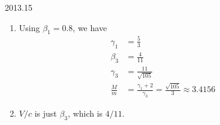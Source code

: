 \documentclass[12pt]{article}
\begin{document}
\begin{solution}{2013.15}
\begin{enumerate}
\item
Using $\beta_1 = 0.8$, we have
\begin{align*}
\gamma_1 & = \frac{5}{3} \\
\beta_3 & = \frac{4}{11} \\
\gamma_3 & = \frac{11}{\sqrt{105}} \\
\frac{M}{m} & = \frac{\gamma_1 + 2}{\gamma_3} = \frac{\sqrt{105}}{3} \approx 3.4156
\end{align*}

\item
$V/c$ is just $\beta_3$, which is $4/11$.

\end{enumerate}


\end{solution}
\end{document}
